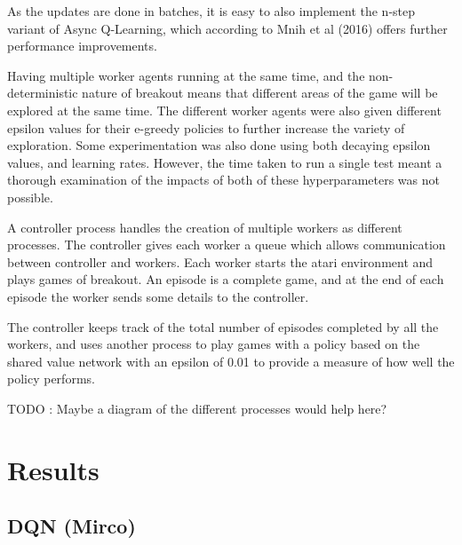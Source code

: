 \documentclass{article}
\begin{document}
As the updates are done in batches, it is easy to also implement the n-step variant of Async Q-Learning, which according to Mnih et al (2016) offers further performance improvements.

Having multiple worker agents running at the same time, and the non-deterministic nature of breakout means that different areas of the game will be explored at the same time.
The different worker agents were also given different epsilon values for their e-greedy policies to further increase the variety of exploration.
Some experimentation was also done using both decaying epsilon values, and learning rates. However, the time taken to run a single test meant a thorough examination of the impacts of both of these hyperparameters was not possible.

A controller process handles the creation of multiple workers as different processes.
The controller gives each worker a queue which allows communication between controller and workers.
Each worker starts the atari environment and plays games of breakout.
An episode is a complete game, and at the end of each episode the worker sends some details to the controller.

The controller keeps track of the total number of episodes completed by all the workers, and uses another process to play games with a policy based on the shared value network with an epsilon of 0.01 to provide a measure of how well the policy performs.

TODO : Maybe a diagram of the different processes would help here?


\section{Results}


\subsection{DQN (Mirco)}
\end{document}
